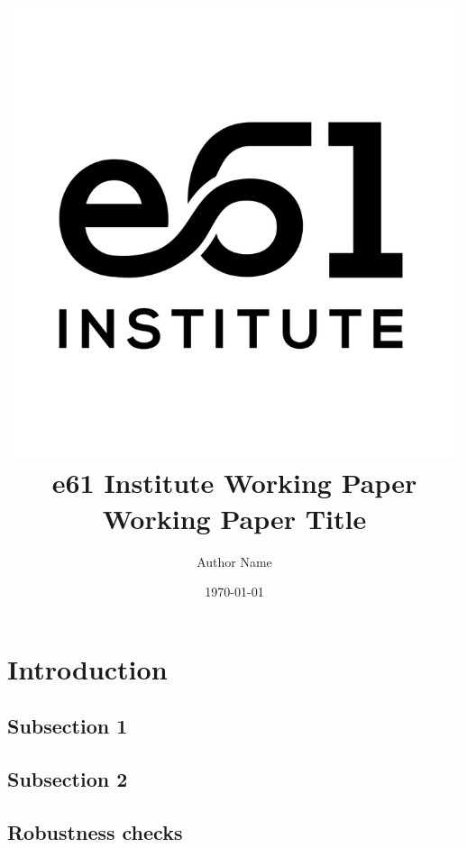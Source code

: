 \documentclass[12pt,a4paper]{article}
\title{\centering\includegraphics[width=0.5\linewidth]{logo.png}\\[0.2ex] \textbf{e61 Institute Working Paper} \\[0.5ex] \LARGE Working Paper Title}
\author{Author Name}
\date{\today}
\begin{document}
\begin{titlepage}
    \maketitle
    \begin{abstract}
        \noindent
        \lipsum[1]
    \end{abstract}
\end{titlepage}

\section{Introduction}\label{sec:intro}

\lipsum[1-6]

\subsection{Subsection 1}

\lipsum[1-3]

\subsection{Subsection 2}

\lipsum[1-4]

\printbibliography

\begin{appendices}

\section{Robustness checks}


\end{appendices}
\end{document}
